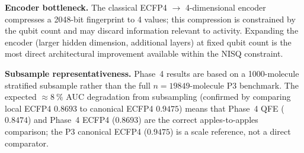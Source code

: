 \textbf{Encoder bottleneck.} The classical ECFP4 $\to$ 4-dimensional encoder
compresses a \num{2048}-bit fingerprint to \num{4} values; this compression
is constrained by the qubit count and may discard information relevant to
activity. Expanding the encoder (larger hidden dimension, additional layers)
at fixed qubit count is the most direct architectural improvement available
within the NISQ constraint.

\textbf{Subsample representativeness.} Phase~4 results are based on a
\num{1000}-molecule stratified subsample rather than the full
$n = \num{19849}$-molecule P3 benchmark. The expected $\approx \qty{8}{\percent}$
AUC degradation from subsampling (confirmed by comparing local ECFP4
$0.8693$ to canonical ECFP4 $0.9475$) means that Phase~4 QFE
($0.8474$) and Phase~4 ECFP4 ($0.8693$) are the correct apples-to-apples
comparison; the P3 canonical ECFP4 ($0.9475$) is a scale reference, not a
direct comparator.

